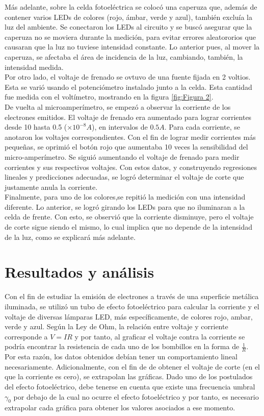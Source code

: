 \documentclass[%
 reprint,
 amsmath,amssymb,
 aps,
]{revtex4-1}
\begin{document}
Más adelante, sobre la celda fotoeléctrica se colocó una caperuza que, además de contener varios LEDs de colores (rojo, ámbar, verde y azul), también excluía la luz del ambiente. Se conectaron los LEDs al circuito y se buscó asegurar que la caperuza no se moviera durante la medición, para evitar errores aleatororios que causaran que la luz no tuviese intensidad constante. Lo anterior pues, al mover la caperuza, se afectaba el área de incidencia de la luz, cambiando, también, la intensidad medida.\\
Por otro lado, el voltaje de frenado se ovtuvo de una fuente fijada en 2 voltios. Esta se varió usando el potenciómetro instalado junto a la celda. Esta cantidad fue medida con el voltímetro, mostrando en la figura \ref{fig:Figura 2}. \\
De vuelta al microamperímetro, se empezó a observar la corriente de los electrones emitidos. El voltaje de frenado era aumentado para lograr corrientes desde 10 hasta 0.5 ($\times 10^{-8} A$), en intervalos de $0.5 A$. Para cada corriente, se anotaron los voltajes correspondientes. Con el fin de lograr medir corrientes más pequeñas, se oprimió el botón rojo que aumentaba 10 veces la sensibilidad del micro-amperímetro. Se siguió aumentando el voltaje de frenado para medir corrientes y sus respectivos voltajes. Con estos datos, y construyendo regresiones lineales y predicciones adecuadas, se logró determinar el voltaje de corte que justamente anula la corriente. \\
Finalmente, para uno de los colores,se repitió la medición con una intensidad diferente. Lo anterior, se logró girando los LEDs para que no iluminaran a la celda de frente. Con esto, se observió que la corriente disminuye, pero el voltaje de corte sigue siendo el mismo, lo cual implica que no depende de la intensidad de la luz, como se explicará más adelante.



\section{\label{resultados} Resultados y análisis}

Con el fin de estudiar la emisión de electrones a través de una superficie metálica iluminada, se utilizó un tubo de efecto fotoeléctrico para calcular la corriente y el voltaje de diversas lámparas LED, más específicamente, de colores rojo, ambar, verde y azul. Según la Ley de Ohm, la relación entre voltaje y corriente corresponde a $V=IR$ y por tanto, al graficar el voltaje contra la corriente se podría encontrar la resistencia de cada uno de los bombillos en la forma de $\frac{1}{R}$. Por esta razón, los datos obtenidos debían tener un comportamiento lineal necesariamente. Adicionalmente, con el fin de de obtener el voltaje de corte (en el que la corriente es cero), se extrapolan las gráficas. Dado uno de los postulados del efecto fotoeléctrico, debe tenerse en cuenta que existe una frecuencia umbral $\gamma_0$ por debajo de la cual no ocurre el efecto fotoeléctrico y por tanto, es necesario extrapolar cada gráfica para obtener los valores asociados a ese momento. 
\end{document}
